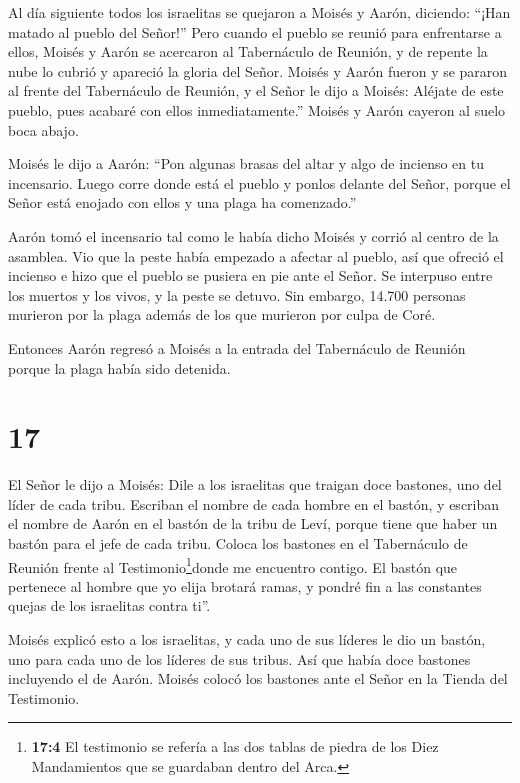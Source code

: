  Al día siguiente todos los israelitas se quejaron a Moisés
y Aarón, diciendo: ``¡Han matado al pueblo del Señor!'' 
Pero cuando el pueblo se reunió para enfrentarse a ellos, Moisés y Aarón
se acercaron al Tabernáculo de Reunión, y de repente la nube lo cubrió y
apareció la gloria del Señor.  Moisés y Aarón fueron y se
pararon al frente del Tabernáculo de Reunión,  y el Señor
le dijo a Moisés:  Aléjate de este pueblo, pues acabaré con
ellos inmediatamente.'' Moisés y Aarón cayeron al suelo boca abajo.

 Moisés le dijo a Aarón: ``Pon algunas brasas del altar y
algo de incienso en tu incensario. Luego corre donde está el pueblo y
ponlos delante del Señor, porque el Señor está enojado con ellos y una
plaga ha comenzado.''

 Aarón tomó el incensario tal como le había dicho Moisés y
corrió al centro de la asamblea. Vio que la peste había empezado a
afectar al pueblo, así que ofreció el incienso e hizo que el pueblo se
pusiera en pie ante el Señor.  Se interpuso entre los
muertos y los vivos, y la peste se detuvo.  Sin embargo,
14.700 personas murieron por la plaga además de los que murieron por
culpa de Coré.

 Entonces Aarón regresó a Moisés a la entrada del
Tabernáculo de Reunión porque la plaga había sido detenida.

\hypertarget{section-16}{%
\section{17}\label{section-16}}

 El Señor le dijo a Moisés:  Dile a los
israelitas que traigan doce bastones, uno del líder de cada tribu.
Escriban el nombre de cada hombre en el bastón,  y escriban
el nombre de Aarón en el bastón de la tribu de Leví, porque tiene que
haber un bastón para el jefe de cada tribu.  Coloca los
bastones en el Tabernáculo de Reunión frente al
Testimonio\footnote{\textbf{17:4} El testimonio se refería a las dos
  tablas de piedra de los Diez Mandamientos que se guardaban dentro del
  Arca.}donde me encuentro contigo.  El bastón que pertenece
al hombre que yo elija brotará ramas, y pondré fin a las constantes
quejas de los israelitas contra ti''.

 Moisés explicó esto a los israelitas, y cada uno de sus
líderes le dio un bastón, uno para cada uno de los líderes de sus
tribus. Así que había doce bastones incluyendo el de Aarón. 
Moisés colocó los bastones ante el Señor en la Tienda del Testimonio.

